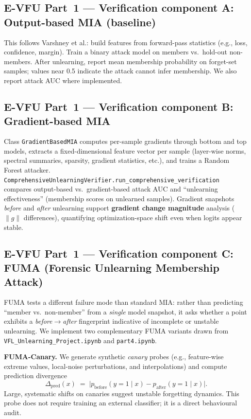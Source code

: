\documentclass[sigconf,nonacm]{acmart}
\begin{document}
\subsection{E-VFU Part~1 --- Verification component A: Output-based MIA (baseline)}
This follows Varshney et al.: build features from forward-pass statistics (e.g., loss, confidence, margin). Train a binary attack model on members vs.\ hold-out non-members. After unlearning, report mean membership probability on forget-set samples; values near 0.5 indicate the attack cannot infer membership. We also report attack AUC where implemented.

\subsection{E-VFU Part~1 --- Verification component B: Gradient-based MIA}
Class \texttt{GradientBasedMIA} computes per-sample gradients through bottom and top models, extracts a fixed-dimensional feature vector per sample (layer-wise norms, spectral summaries, sparsity, gradient statistics, etc.), and trains a Random Forest attacker. \texttt{ComprehensiveUnlearningVerifier.run\_comprehensive\_verification} compares output-based vs.\ gradient-based attack AUC and ``unlearning effectiveness'' (membership scores on unlearned samples). Gradient snapshots \emph{before} and \emph{after} unlearning support \textbf{gradient change magnitude} analysis ($\|g\|$ differences), quantifying optimization-space shift even when logits appear stable.

\subsection{E-VFU Part~1 --- Verification component C: FUMA (Forensic Unlearning Membership Attack)}
FUMA tests a different failure mode than standard MIA: rather than predicting ``member vs.\ non-member'' from a \emph{single} model snapshot, it asks whether a point exhibits a \emph{before$\to$after} fingerprint indicative of incomplete or unstable unlearning. We implement two complementary FUMA variants drawn from \texttt{VFL\_Unlearning\_Project.ipynb} and \texttt{part4.ipynb}.

\textbf{FUMA-Canary.} We generate synthetic \emph{canary} probes (e.g., feature-wise extreme values, local-noise perturbations, and interpolations) and compute prediction divergence
\begin{equation}
  \Delta_{\mathrm{pred}}(x) \;=\; \bigl|p_{\mathrm{before}}(y{=}1\mid x) - p_{\mathrm{after}}(y{=}1\mid x)\bigr|.
\end{equation}
Large, systematic shifts on canaries suggest unstable forgetting dynamics. This probe does not require training an external classifier; it is a direct behavioural audit.
\end{document}
